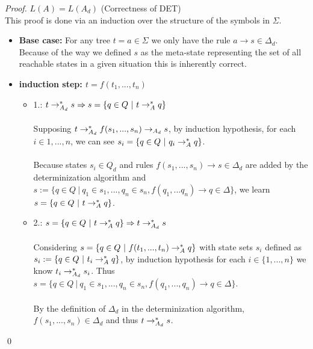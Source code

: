 \documentclass{llncs}
\begin{document}
\begin{proof}{\(L(A) = L(A_d)\) (Correctness of DET) \cite{tata-nfta}}\\
	This proof is done via an induction over the structure of the symbols in \(\Sigma\).
	\begin{itemize}
		\item \textbf{Base case:}
			For any tree \(t = a \in \Sigma\) we only have the rule \(a \rightarrow s \in \Delta_d\). Because of the way we defined \(s\) as the meta-state representing the set of all reachable states in a given situation this is inherently correct.
			\\
		\item \textbf{induction step: \(t = f(t_1,... , t_n)\)}
			\begin{itemize}
				\item 
				1.: \(t \rightarrow_{A_d}^* s \Rightarrow s = \{q \in Q ~|~ t \rightarrow_A^* q\}\)\\\\
				Supposing \(t \rightarrow_{A_d}^* f(s_1, ..., s_n) \rightarrow_{A_d} s\), by induction hypothesis, for each \(i \in {1,..., n}\), we can see \(s_i = \{q \in Q ~|~ q_i \rightarrow_A^* q\}\).\\
				\\
			    Because states \(s_i \in Q_d\) and rules \(f(s_1, ..., s_n) \rightarrow s \in \Delta_d\) are added by the determinization algorithm and \( s := \{ q \in Q ~|~ q_1 \in s_1,..., q_n \in s_n, f(q_1,...q_n) \rightarrow q \in \Delta \} \), we learn \(s = \{q \in Q ~|~ t \rightarrow_A^* q\}\).
				\\
				\item
				2.: \(s = \{q \in Q ~|~ t \rightarrow_A^* q\} \Rightarrow t \rightarrow_{A_d}^* s\)\\\\
				Considering \(s = \{q \in Q ~|~ f(t_1, ..., t_n) \rightarrow_A^* q\}\) with state sets \(s_i\) defined as \(s_i := \{q \in Q ~|~ t_i \rightarrow_A^* q\}\), by induction hypothesis for each \(i \in \{1, ..., n\}\) we know \(t_i \rightarrow_{A_d}^* s_i\).
				Thus \( s = \{ q \in Q ~|~ q_1 \in s_1,..., q_n \in s_n, f(q_1, ..., q_n) \rightarrow q \in \Delta \} \).\\
				\\
				By the definition of \(\Delta_d\) in the determinization algorithm, \(f(s_1, ..., s_n) \in \Delta_d\) and thus \(t \rightarrow_{A_d}^* s\).
			\end{itemize}
	\end{itemize}
	\qed
\end{proof}
\end{document}
